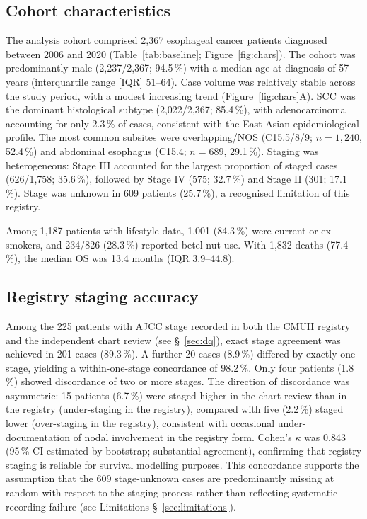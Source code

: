 \documentclass[12pt,a4paper]{article}
\begin{document}
\subsection{Cohort characteristics}
The analysis cohort comprised 2,367 esophageal cancer patients diagnosed
between 2006 and 2020 (Table~\ref{tab:baseline}; Figure~\ref{fig:chars}).
The cohort was predominantly male (2,237/2,367; 94.5\,\%) with a median
age at diagnosis of 57 years (interquartile range [IQR] 51--64). Case
volume was relatively stable across the study period, with a modest
increasing trend (Figure~\ref{fig:chars}A). SCC was the dominant
histological subtype (2,022/2,367; 85.4\,\%), with adenocarcinoma
accounting for only 2.3\,\% of cases, consistent with the East Asian
epidemiological profile. The most common subsites were overlapping/NOS
(C15.5/8/9; $n = 1{,}240$, 52.4\,\%) and abdominal esophagus (C15.4;
$n = 689$, 29.1\,\%). Staging was heterogeneous: Stage III accounted for
the largest proportion of staged cases (626/1,758; 35.6\,\%), followed by
Stage IV (575; 32.7\,\%) and Stage II (301; 17.1\,\%). Stage was unknown
in 609 patients (25.7\,\%), a recognised limitation of this registry.

Among 1,187 patients with lifestyle data, 1,001 (84.3\,\%) were current
or ex-smokers, and 234/826 (28.3\,\%) reported betel nut use. With
1,832 deaths (77.4\,\%), the median OS was 13.4 months (IQR 3.9--44.8).

\subsection{Registry staging accuracy}
\label{sec:dq_results}
Among the 225 patients with AJCC stage recorded in both the CMUH registry
and the independent chart review (see §~\ref{sec:dq}), exact
stage agreement was achieved in 201 cases (89.3\,\%). A further 20 cases
(8.9\,\%) differed by exactly one stage, yielding a within-one-stage
concordance of 98.2\,\%. Only four patients (1.8\,\%) showed discordance
of two or more stages. The direction of discordance was asymmetric: 15
patients (6.7\,\%) were staged higher in the chart review than in the
registry (under-staging in the registry), compared with five (2.2\,\%)
staged lower (over-staging in the registry), consistent with occasional
under-documentation of nodal involvement in the registry form. Cohen's
$\kappa$ was 0.843 (95\,\% CI estimated by bootstrap; substantial
agreement), confirming that registry staging is reliable for survival
modelling purposes. This concordance supports the assumption that the
609 stage-unknown cases are predominantly missing at random with respect
to the staging process rather than reflecting systematic recording failure
(see Limitations §~\ref{sec:limitations}).
\end{document}
